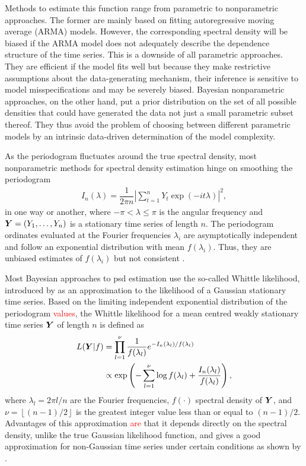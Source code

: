 \documentclass[twocolumn,final]{svjour3}
\newcommand{\bm}[1]{\mbox{\boldmath $#1$}}
\begin{document}
Methods to estimate this function range from parametric to nonparametric approaches.  The former are mainly based on fitting  autoregressive moving average (ARMA) models. However, the corresponding spectral density will be biased if the ARMA model does not adequately describe the dependence structure of the time series. This is a downside of all parametric approaches.
They are efficient if the model fits well but because they make restrictive assumptions about the data-generating mechanism, their inference is sensitive to model misspecifications and may  be severely biased. 
Bayesian nonparametric approaches, on the other hand, put a prior distribution on the set of all possible densities that could have generated the data not just a small parametric subset thereof. They thus avoid the problem of choosing between different parametric models  by an intrinsic data-driven determination of the model complexity.

As the periodogram fluctuates around the true spectral density, most  nonparametric methods for spectral density estimation hinge on  smoothing the periodogram
\begin{align*}
I_n(\lambda) = \dfrac{1}{2 \pi n} \left| \sum_{t=1}^{n} Y_t \exp \left( -i t \lambda\right)\right|^2,
\end{align*}
in one way or another, where $-\pi < \lambda \leq \pi$ is the angular frequency and $\bm{Y}=(Y_1,\ldots,Y_n)$ is a stationary time series of length $n$. The periodogram ordinates evaluated at the Fourier frequencies $\lambda_i$  are asymptotically independent and follow an exponential distribution with mean $f(\lambda_i)$.  Thus, they are unbiased estimates of $f(\lambda_i)$  but not consistent \citep{Brockwell:1986}.


Most Bayesian approaches to psd estimation use the so-called Whittle likelihood, introduced by \citep{Whittle:1957} as an approximation to the likelihood of a Gaussian stationary time series.  Based on the  limiting independent exponential distribution of the periodogram \textcolor{red}{values}, the Whittle likelihood for a mean centred weakly stationary time series $\bm{Y}$ of length $n$ is defined as
\begin{align}
L(\bm{Y} | f) &= \prod_{l=1}^{\nu}\dfrac{1}{f(\lambda_{l})} e^{-I_n(\lambda_l)/f(\lambda_l)}  \nonumber \\
&\propto \exp \left( - \sum_{l=1}^{\nu} \log f(\lambda_l) + \dfrac{I_{n}(\lambda_l)}{f(\lambda_l)} \right),\label{eq:whittle_like}
\end{align}
where $\lambda_l = 2\pi l / n$ are the Fourier frequencies, $f(\cdot)$ spectral density of $\bm{Y}$, and $\nu = \left\lfloor (n-1)/2 \right\rfloor$ is the greatest integer value less than or equal to $(n-1)/2$. Advantages of this approximation \textcolor{red}{are} that it depends directly on the spectral density, unlike the true Gaussian likelihood function, and gives a good approximation for non-Gaussian time series under certain conditions as shown by \cite{ShaoXiaofeng2007ASTf}.
\end{document}
